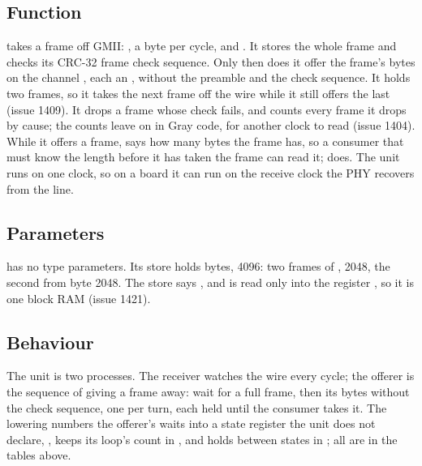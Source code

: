 
%
{}

\subsection*{Function}

 takes a frame off GMII: , a byte per cycle,
 and . It stores the whole frame and checks
its CRC-32 frame check sequence. Only then does it offer the frame's
bytes on the channel , each an , without the
preamble and the check sequence. It holds two frames, so it takes the
next frame off the wire while it still offers the last (issue 1409).
It drops a frame whose check fails, and counts every frame it drops
by cause; the counts leave on  in Gray code, for
another clock to read (issue 1404).
While it offers a frame,  says how many bytes the frame
has, so a consumer that must know the length before it has taken the
frame can read it;  does.
The unit runs on one clock, so on a board it can run on the receive
clock the PHY recovers from the line.

\subsection*{Parameters}

 has no type parameters. Its store holds
 bytes, 4096: two frames of , 2048,
the second from byte 2048. The store says
, and is read only into the register
, so it is one block RAM (issue 1421).


\subsection*{Behaviour}

The unit is two processes. The receiver watches the wire every cycle;
the offerer is the sequence of giving a frame away: wait for a full
frame, then its bytes without the check sequence, one per turn, each
held until the consumer takes it. The lowering numbers the offerer's
waits into a state register the unit does not declare, ,
keeps its loop's count in , and holds  between
states in ; all are in the tables above.

